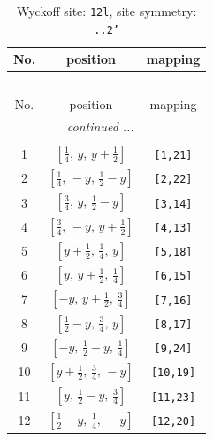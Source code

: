 \documentclass[fleqn,8pt]{jsarticle}
\begin{document}
\begin{longtable}{ccc}
\caption{Wyckoff site: {\tt 12l}, site symmetry: {\tt ..2'}}
 \\
 \hline \hline
No. & position & mapping \\ \hline \endfirsthead

\multicolumn{2}{l}{\tablename\ \thetable{}} \\
 \hline \hline
No. & position & mapping \\ \hline \endhead

 \hline \hline
\multicolumn{2}{r}{\footnotesize\it continued ...} \\ \endfoot

 \hline \hline
\multicolumn{2}{r}{} \\ \endlastfoot

1 & $\left[ \frac{1}{4},\, y,\, y + \frac{1}{2} \right]$ & {\tt [1,21]} \\ \hline
2 & $\left[ \frac{1}{4},\, - y,\, \frac{1}{2} - y \right]$ & {\tt [2,22]} \\ \hline
3 & $\left[ \frac{3}{4},\, y,\, \frac{1}{2} - y \right]$ & {\tt [3,14]} \\ \hline
4 & $\left[ \frac{3}{4},\, - y,\, y + \frac{1}{2} \right]$ & {\tt [4,13]} \\ \hline
5 & $\left[ y + \frac{1}{2},\, \frac{1}{4},\, y \right]$ & {\tt [5,18]} \\ \hline
6 & $\left[ y,\, y + \frac{1}{2},\, \frac{1}{4} \right]$ & {\tt [6,15]} \\ \hline
7 & $\left[ - y,\, y + \frac{1}{2},\, \frac{3}{4} \right]$ & {\tt [7,16]} \\ \hline
8 & $\left[ \frac{1}{2} - y,\, \frac{3}{4},\, y \right]$ & {\tt [8,17]} \\ \hline
9 & $\left[ - y,\, \frac{1}{2} - y,\, \frac{1}{4} \right]$ & {\tt [9,24]} \\ \hline
10 & $\left[ y + \frac{1}{2},\, \frac{3}{4},\, - y \right]$ & {\tt [10,19]} \\ \hline
11 & $\left[ y,\, \frac{1}{2} - y,\, \frac{3}{4} \right]$ & {\tt [11,23]} \\ \hline
12 & $\left[ \frac{1}{2} - y,\, \frac{1}{4},\, - y \right]$ & {\tt [12,20]} \\
\end{longtable}
\renewcommand{\arraystretch}{1.2}
\end{document}
